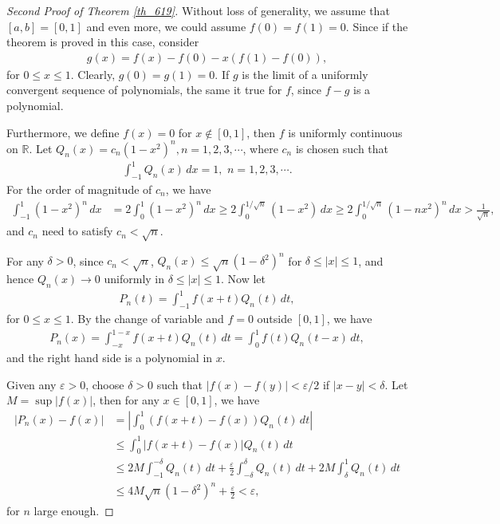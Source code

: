\documentclass[11pt]{book}
\theoremstyle{definition}
\numberwithin{equation}{chapter}
\begin{document}
\begin{proof}[Second Proof of Theorem \ref{th_619}]
Without loss of generality, we assume that $[a,b] = [0,1]$ and even more, we could assume $f(0) = f(1) = 0$. Since if the theorem is proved in this case, consider
\begin{align*}
    g(x) = f(x) - f(0) - x \left(f(1) - f(0)\right),
\end{align*}
for $0 \leq x \leq 1$. Clearly, $g(0) = g(1) = 0$. If $g$ is the limit of a uniformly convergent sequence of polynomials, the same it true for $f$, since $f - g$ is a polynomial.

Furthermore, we define $f(x) = 0$ for $x \notin [0,1]$, then $f$ is uniformly continuous on $\mathbb{R}$. Let $Q_n(x) = c_n (1 - x^2)^n, n = 1,2,3,\cdots$, where $c_n$ is chosen such that
\begin{align*}
    \int^1_{-1} Q_n(x) \,dx = 1, \,\, n = 1,2,3,\cdots.
\end{align*}
For the order of magnitude of $c_n$, we have
\begin{align*}
    \int^1_{-1} (1 - x^2)^n \,dx & = 2 \int^1_0 (1 - x^2)^n \,dx \geq 2 \int^{1/\sqrt{n}}_0 (1 - x^2) \,dx \geq 2 \int^{1/\sqrt{n}}_0 (1 - nx^2)^n \,dx > \frac{1}{\sqrt{n}},
\end{align*}
and $c_n$ need to satisfy $c_n < \sqrt{n}$. 

For any $\delta > 0$, since $c_n < \sqrt{n}$, $Q_n(x) \leq \sqrt{n} (1 - \delta^2)^n$ for $\delta \leq \left|x\right| \leq 1$, and hence $Q_n(x) \to 0$ uniformly in $\delta \leq \left|x\right| \leq 1$. Now let
\begin{align*}
    P_n(t) = \int^1_{-1} f(x+t) Q_n(t) \,dt,
\end{align*}
for $0 \leq x \leq 1$. By the change of variable and $f = 0$ outside $[0,1]$, we have
\begin{align*}
    P_n(x) = \int^{1-x}_{-x} f(x+t) Q_n(t) \,dt = \int^1_0 f(t) Q_n(t - x) \,dt,
\end{align*}
and the right hand side is a polynomial in $x$. 

Given any $\varepsilon > 0$, choose $\delta > 0$ such that $\left|f(x) - f(y)\right| < \varepsilon/2$ if $\left|x - y\right| < \delta$. Let $M = \sup \left|f(x)\right|$, then for any $x \in [0,1]$, we have
\begin{align*}
    \left|P_n(x) - f(x)\right| & = \left|\int^1_0 \left(f(x+t) - f(x)\right) Q_n(t) \,dt \right| \\
    & \leq \int^1_0 \left|f(x+t) - f(x)\right| Q_n(t) \,dt \\
    & \leq 2M \int^{-\delta}_{-1} Q_n(t) \,dt + \frac{\varepsilon}{2} \int^{\delta}_{-\delta} Q_n(t) \,dt + 2M \int^1_{\delta} Q_n(t) \,dt \\
    & \leq 4M \sqrt{n} (1 - \delta^2)^n + \frac{\varepsilon}{2} < \varepsilon,
\end{align*}
for $n$ large enough.
\end{proof}
\end{document}
